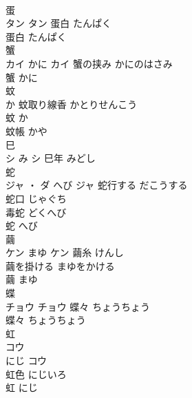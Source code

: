 \documentclass[8pt]{extreport}
\begin{document}
\begin{CJK}{UTF8}{min}
\\	蛋	
\\	タン		タン	蛋白	たんぱく	
\\	蛋白	たんぱく	
\\	蟹	
\\	カイ	かに	カイ	蟹の挟み	かにのはさみ	
\\	蟹	かに	
\\	蚊	
\\	か		蚊取り線香	かとりせんこう	
\\	蚊	か	
\\	蚊帳	かや	
\\	巳	
\\	シ	み	シ	巳年	みどし	
\\	蛇	
\\	ジャ ・ ダ	へび	ジャ	蛇行する	だこうする	
\\	蛇口	じゃぐち	
\\	毒蛇	どくへび	
\\	蛇	へび	
\\	繭	
\\	ケン	まゆ	ケン	繭糸	けんし	
\\	繭を掛ける	まゆをかける	
\\	繭	まゆ	
\\	蝶	
\\	チョウ		チョウ	蝶々	ちょうちょう	
\\	蝶々	ちょうちょう	
\\	虹	
\\	コウ
\\	にじ	コウ
\\	虹色	にじいろ	
\\	虹	にじ	
\end{CJK}
\end{document}
